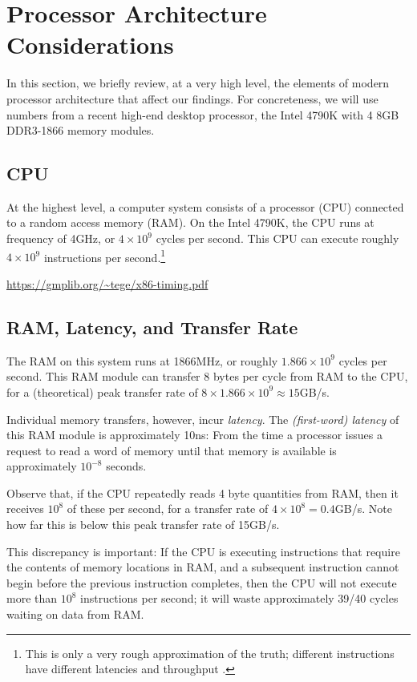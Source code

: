 \documentclass{patmorin}
\begin{document}
\section{Processor Architecture Considerations}

In this section, we briefly review, at a very high level, the elements of
modern processor architecture that affect our findings.  For concreteness,
we will use numbers from a recent high-end desktop processor, the Intel
4790K \cite{S} with 4 8GB DDR3-1866 memory modules.

\subsection{CPU}

At the highest level, a computer system consists of a processor (CPU)
connected to a random access memory (RAM). On the Intel 4790K, the
CPU runs at frequency of 4GHz, or $4\times10^9$ cycles per second.
This CPU can execute roughly $4\times 10^{9}$ instructions per
second.\footnote{This is only a very rough approximation of the
truth; different instructions have different latencies and throughput
\cite{granlund.instruction}.}

\url{https://gmplib.org/~tege/x86-timing.pdf}


\subsection{RAM, Latency, and Transfer Rate}

The RAM on this system runs at 1866MHz, or roughly $1.866\times10^9$
cycles per second.  This RAM module can transfer 8 bytes per cycle
from RAM to the CPU, for a (theoretical) peak transfer rate of $8\times
1.866\times10^9\approx 15$GB/s.

Individual memory transfers, however, incur \emph{latency}.  The
\emph{(first-word) latency} of this RAM module is approximately 10ns:
From the time a processor issues a request to read a word of memory
until that memory is available is approximately $10^{-8}$ seconds.

Observe that, if the CPU repeatedly reads 4 byte quantities from RAM,
then it receives $10^8$ of these per second, for a transfer rate of
$4\times 10^8=0.4$GB/s.  Note how far this is below this peak transfer
rate of 15GB/s.

This discrepancy is important: If the CPU is executing instructions
that require the contents of memory locations in RAM, and a subsequent
instruction cannot begin before the previous instruction completes,
then the CPU will not execute more than $10^8$ instructions per second;
it will waste approximately 39/40 cycles waiting on data from RAM.
\end{document}
